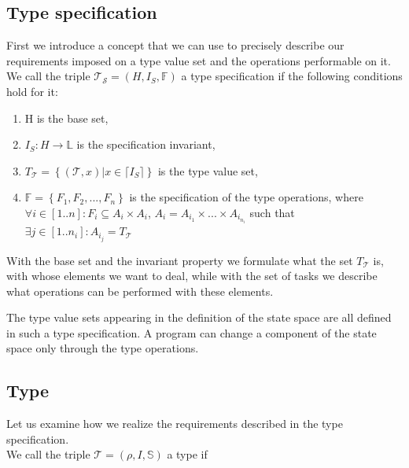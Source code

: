 \documentclass[margin=0px]{article}
\begin{document}
\subsection{Type specification}

First we introduce a concept that we can use to precisely
describe our requirements imposed on a type value set and the
operations performable on it.\\

\noindent We call the triple $\mathcal{T_{S}}=(H,I_{S},\mathbb{F})$ a type specification if
the following conditions hold for it:

\begin{enumerate}
    \item H is the base set,

    \item $I_{S} : H \to \mathbb{L} $ is the specification invariant,

    \item $T_{\mathcal{T}} = \left\{ {(\mathcal{T},x) | x \in \lceil I_{S}} \rceil\right\}$ is the type value set,

    \item $\mathbb{F} = \left\{ {F_{1},F_{2},...,F_{n}}\right\}$ is the specification of the type operations, where\\
          $\forall i \in [1..n]: F_{i} \subseteq A_{i} \times A_{i}$, $A_{i} = A_{i_{1}} \times ... \times A_{i_{n_{i}}}$ such that\\
          $\exists j \in [1..n_{i}]: A_{i_{j}} = T_{\mathcal{T}} $
\end{enumerate}

With the base set and the invariant property we formulate
what the set $T_{\mathcal{T}}$ is, with whose elements we want to deal, while with the set of tasks
we describe what operations can be performed
with these elements.

The type value sets appearing in the definition of the state space are all defined in such a type specification.
A program can change a component of the state space only through the type operations.
\subsection{Type}

Let us examine how we realize the requirements described in the type specification.\\

\noindent We call the triple $\mathcal{T}=(\rho,I,\mathbb{S})$ a type if
\end{document}
